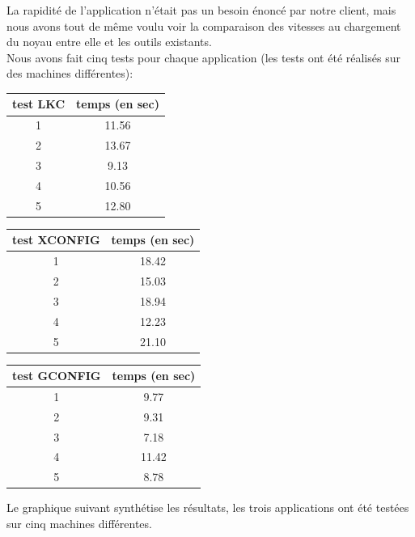 ﻿\documentclass[17pts]{report}
\begin{document}
La rapidité de l'application n'était pas un besoin énoncé par notre client,
mais nous avons tout de même voulu voir la comparaison des vitesses au
chargement du noyau entre elle et les outils existants.\\

Nous avons fait cinq tests pour chaque application (les tests ont été réalisés
sur des machines différentes):

\begin{tabular}{|c|c|}
\hline
test LKC & temps (en sec) \\
\hline
\hline
1 & 11.56 \\
\hline
2 & 13.67 \\
\hline
3 & 9.13 \\
\hline
4 & 10.56 \\
\hline
5 & 12.80 \\
\hline
\end{tabular}
\newline
\newline

\begin{tabular}{|c|c|}
\hline
test XCONFIG & temps (en sec) \\
\hline
\hline
1 & 18.42 \\
\hline
2 & 15.03 \\
\hline
3 & 18.94 \\
\hline
4 & 12.23 \\
\hline
5 & 21.10 \\
\hline
\end{tabular}
\newline
\newline

\begin{tabular}{|c|c|}
\hline
test GCONFIG & temps (en sec) \\
\hline
\hline
1 & 9.77 \\
\hline
2 & 9.31 \\
\hline
3 & 7.18 \\
\hline
4 & 11.42 \\
\hline
5 & 8.78 \\
\hline
\end{tabular}
\newline
\newline

Le graphique suivant synthétise les résultats, les trois applications ont été
testées sur cinq machines différentes.
\end{document}
